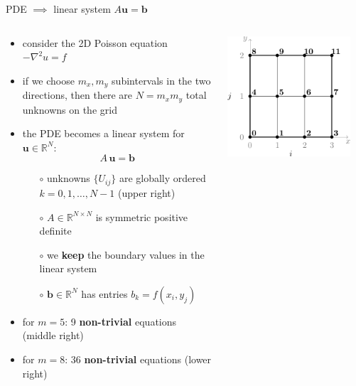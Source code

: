 \documentclass[10pt,
               svgnames,
               hyperref={colorlinks,citecolor=DeepPink4,linkcolor=FireBrick,urlcolor=Maroon},
               usepdftitle=false]{beamer}
\newcommand{\bb}{\mathbf{b}}
\newcommand{\bu}{\mathbf{u}}
\newcommand{\RR}{\mathbb{R}}
\newcommand{\grad}{\nabla}
\begin{document}
\begin{frame}{PDE $\implies$ linear system $A\bu=\bb$}
\begin{columns}
\begin{column}{0.73\textwidth}
\begin{itemize}
\item consider the 2D Poisson equation $-\grad^2 u = f$
\item if we choose $m_x,m_y$ subintervals in the two directions, then there are $N=m_x m_y$ total unknowns on the grid
\item the PDE becomes a linear system for $\bu \in \RR^N$:
	$$A\, \bu = \bb$$

	\begin{itemize}
	\item[$\circ$] unknowns $\{U_{ij}\}$ are globally ordered $k=0,1,\dots,N-1$ (upper right)
	\item[$\circ$] $A \in \RR^{N\times N}$ is symmetric positive definite
	\item[$\circ$] we \textbf{keep} the boundary values in the linear system
	\item[$\circ$] $\bb \in \RR^N$ has entries $b_k = f(x_i,y_j)$
	\end{itemize}
\item for $m=5$: 9 \textbf{non-trivial} equations (middle right)
\item for $m=8$: 36 \textbf{non-trivial} equations (lower right)
\end{itemize}
\end{column}
\begin{column}{0.27\textwidth}
\hfill \includegraphics[width=0.9\textwidth]{images/gridordering.png}


\end{column}
\end{columns}
\end{frame}
\end{document}
